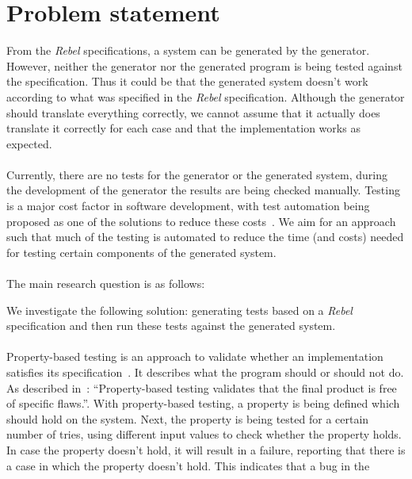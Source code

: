 \section{Problem statement}
From the \textit{Rebel} specifications, a system can be generated by the
generator. However, neither the generator nor the generated program is being
tested against the specification. Thus it could be that the generated system
doesn't work according to what was specified in the \textit{Rebel}
specification. Although the generator should translate everything correctly, we
cannot assume that it actually does translate it correctly for each case and
that the implementation works as expected.\\
\\
Currently, there are no tests for the generator or the generated system, during
the development of the generator the results are being checked manually. Testing
is a major cost factor in software development, with test automation being
proposed as one of the solutions to reduce these
costs~\cite{ramler2006economic}. We aim for an approach such that much of the
testing is automated to reduce the time (and costs) needed for testing certain
components of the generated system.\\
\\
The main research question is as follows:
\begin{quote}
  \rqMain
\end{quote}
We investigate the following solution: generating tests based on a
\textit{Rebel} specification and then run these tests against the generated
system.\\
\\
Property-based testing is an approach to validate whether an implementation
satisfies its specification~\cite{fink1997property,fink1994property}. It describes what the
program should or should not do. As described in~\cite{fink1997property}:
``Property-based testing validates that the final product is free of specific
flaws.''. With property-based testing, a property is being defined which should
hold on the system. Next, the property is being tested for a certain number of
tries, using different input values to check whether the property holds. In case
the property doesn't hold, it will result in a failure, reporting that there is
a case in which the property doesn't hold. This indicates that a bug in the
